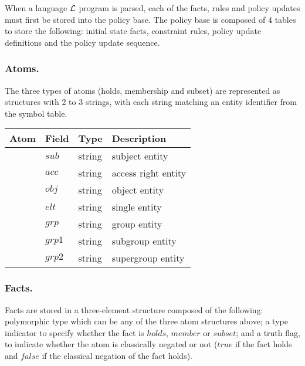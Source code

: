 \documentclass[global,twocolumn,final]{svjour}
\newenvironment{vquote}
  {\begin{list}{}{\leftmargin 1em}\item[]}
  {\end{list}}
\begin{document}
      When a language ${\cal L}$ program is parsed, each of the facts,
      rules and policy updates must first be stored into the policy base.
      The policy base is composed of 4 tables to store the following:
      initial state facts, constraint rules, policy update definitions and
      the policy update sequence.

      \subsubsection{Atoms.}

        The three types of atoms (holds, membership and subset) are
        represented as structures with 2 to 3 strings, with each string
        matching an entity identifier from the symbol table.

        \begin{vquote}
          \begin{tabular}[t]{|l|l|l|l|}
            \hline
            \textbf{Atom} & \textbf{Field} & \textbf{Type} & \textbf{Description} \\
            \hline
            {\multirow{3}{*}{holds}} & $sub$ & string & subject entity \\
            \cline{2-4}
            & $acc$ & string & access right entity \\
            \cline{2-4}
            & $obj$ & string & object entity \\
            \hline
            \hline
            {\multirow{2}{*}{member}} & $elt$ & string & single entity \\
            \cline{2-4}
            & $grp$ & string & group entity \\
            \hline
            \hline
            {\multirow{2}{*}{subset}} & $grp1$ & string & subgroup entity \\
            \cline{2-4}
            & $grp2$ & string & supergroup entity \\
            \hline
          \end{tabular}
        \end{vquote}

      \subsubsection{Facts.}

        Facts are stored in a three-element structure composed of the
        following: polymorphic type which can be any of the three atom
        structures above; a type indicator to specify whether the fact is
        $holds$, $member$ or $subset$; and a truth flag, to indicate whether the
        atom is classically negated or not ($true$ if the fact holds
        and $false$ if the classical negation of the fact holds).
\end{document}
